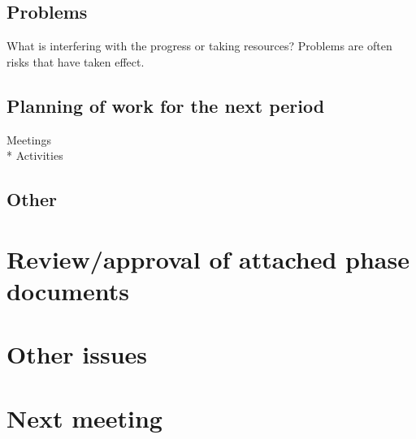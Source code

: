 \subsection{Problems}
What is interfering with the progress or taking resources? Problems are often risks that have taken effect.
\subsection{Planning of work for the next period}
Meetings\\*
Activities
\subsection{Other}
\section{Review/approval of attached phase documents}
\section{Other issues}
\section{Next meeting}
